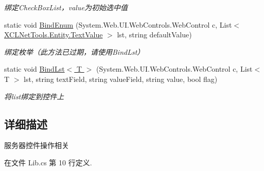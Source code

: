 \begin{DoxyCompactItemize}
\begin{DoxyCompactList}\small\item\em 绑定\-Check\-Box\-List，value为初始选中值 \end{DoxyCompactList}\item 
static void \hyperlink{class_x_c_l_net_tools_1_1_control_1_1_server_control_1_1_lib_acf0e494ba2e94742818fbebfd883ab17}{Bind\-Enum} (System.\-Web.\-U\-I.\-Web\-Controls.\-Web\-Control c, List$<$ \hyperlink{class_x_c_l_net_tools_1_1_entity_1_1_text_value}{X\-C\-L\-Net\-Tools.\-Entity.\-Text\-Value} $>$ lst, string default\-Value)
\begin{DoxyCompactList}\small\item\em 绑定枚举（此方法已过期，请使用\-Bind\-Lst） \end{DoxyCompactList}\item 
static void \hyperlink{class_x_c_l_net_tools_1_1_control_1_1_server_control_1_1_lib_ad5ebfd4eb97120e0049cd0260e150ed9}{Bind\-Lst$<$ T $>$} (System.\-Web.\-U\-I.\-Web\-Controls.\-Web\-Control c, List$<$ T $>$ lst, string text\-Field, string value\-Field, string value, bool flag)
\begin{DoxyCompactList}\small\item\em 将list绑定到控件上 \end{DoxyCompactList}\end{DoxyCompactItemize}


\subsection{详细描述}
服务器控件操作相关 



在文件 Lib.\-cs 第 10 行定义.




